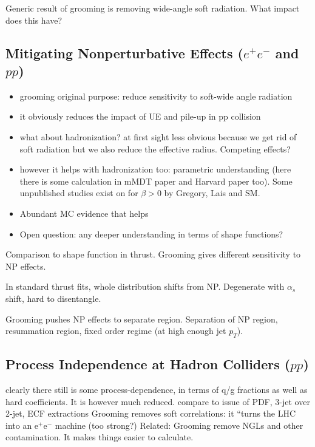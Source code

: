 

Generic result of grooming is removing wide-angle soft radiation.  What impact does this have?

\subsection{Mitigating Nonperturbative Effects ($e^+e^-$ and $pp$)}


\begin{itemize}
\item grooming original purpose: reduce sensitivity to soft-wide angle radiation
\item it obviously reduces the impact of UE and pile-up in pp collision
\item what about hadronization? at first sight less obvious because we get rid of soft radiation but we also reduce the effective radius. Competing effects?
\item however it helps with hadronization too: parametric understanding (here there is some calculation in mMDT paper and Harvard paper too). Some unpublished studies exist on  for $\beta>0$ by Gregory, Lais and SM. 
\item Abundant MC evidence that helps
\item Open question: any deeper understanding in terms of shape functions?
\end{itemize}

Comparison to shape function in thrust.  Grooming gives different sensitivity to NP effects.

In standard thrust fits, whole distribution shifts from NP.  Degenerate with $\alpha_s$ shift, hard to disentangle.

Grooming pushes NP effects to separate region.  Separation of NP region, resummation region, fixed order regime (at high enough jet $p_T$).

\subsection{Process Independence at Hadron Colliders ($pp$)}

clearly there still is some process-dependence, in terms of q/g fractions as well as hard coefficients. It is however much reduced.
compare to issue of PDF, 3-jet over 2-jet, ECF extractions
Grooming removes soft correlations: it ``turns the LHC into an e$^+$e$^-$ machine (too strong?)
Related:  Grooming remove NGLs and other contamination. It makes things easier to calculate. 


